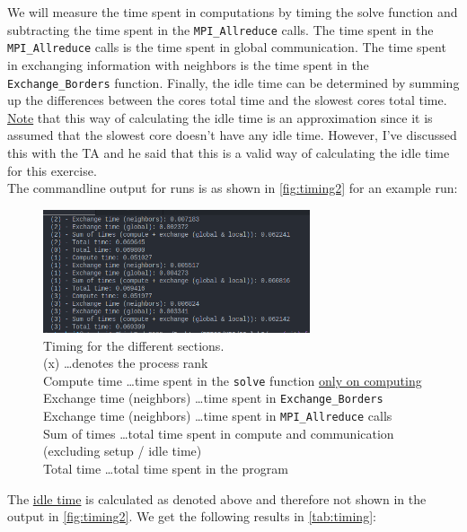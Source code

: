 We will measure the time spent in computations by timing the solve function and subtracting the time spent in the \texttt{MPI\_Allreduce} calls. The time spent in the \texttt{MPI\_Allreduce} calls is the time spent in global communication. The time spent in exchanging information with neighbors is the time spent in the \texttt{Exchange\_Borders} function. Finally, the idle time can be determined by summing up the differences between the cores total time and the slowest cores total time. \underline{Note} that this way of calculating the idle time is an approximation since it is assumed that the slowest core doesn't have any idle time. However, I've discussed this with the TA and he said that this is a valid way of calculating the idle time for this exercise.\\
The commandline output for runs is as shown in \autoref{fig:timing2} for an example run: 
\begin{figure}[H]
    \centering
    \includegraphics[width=0.7\textwidth]{../fig/lab2/ex2.png}
    \caption{Timing for the different sections.\\
    (x) \dots denotes the process rank\\
    Compute time \dots time spent in the \texttt{solve} function \underline{only on computing}\\
    Exchange time (neighbors) \dots time spent in \texttt{Exchange\_Borders} \\
    Exchange time (neighbors) \dots time spent in \texttt{MPI\_Allreduce} calls \\
    Sum of times \dots total time spent in compute and communication (excluding setup / idle time)\\
    Total time \dots total time spent in the program\\
    }
    \label{fig:timing2}
\end{figure}

The \underline{idle time} is calculated as denoted above and therefore not shown in the output in \autoref{fig:timing2}. We get the following results in \autoref{tab:timing}:


